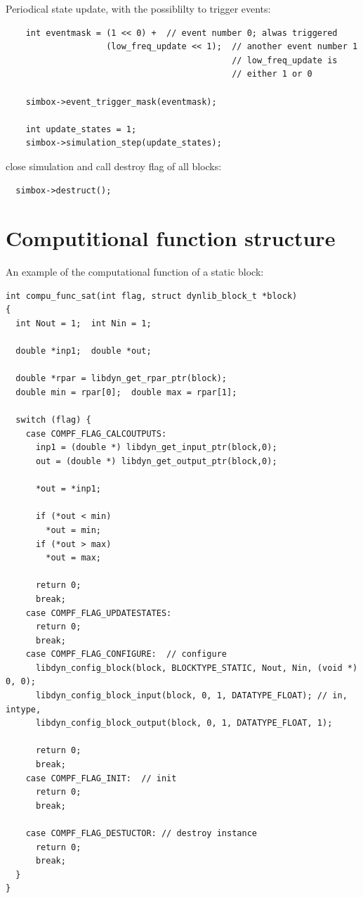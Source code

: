 \documentclass[%
	pdftex,%
	a4paper,%
	oneside,%
	11pt,%
	halfparskip,%
	headsepline,%
	bibtotocnumbered,%
	idxtotoc%
]{scrartcl}
\begin{document}
Periodical state update, with the possiblilty to trigger events:

\begin{verbatim}
    int eventmask = (1 << 0) +  // event number 0; alwas triggered
                    (low_freq_update << 1);  // another event number 1 
                                             // low_freq_update is 
                                             // either 1 or 0

    simbox->event_trigger_mask(eventmask);
    
    int update_states = 1;
    simbox->simulation_step(update_states); 
\end{verbatim}

close simulation and call destroy flag of all blocks:

\begin{verbatim}
  simbox->destruct();
\end{verbatim}


\section{Computitional function structure}

An example of the computational function of a static block:

\begin{verbatim}
int compu_func_sat(int flag, struct dynlib_block_t *block)
{
  int Nout = 1;  int Nin = 1;

  double *inp1;  double *out;	

  double *rpar = libdyn_get_rpar_ptr(block);
  double min = rpar[0];  double max = rpar[1];

  switch (flag) {
    case COMPF_FLAG_CALCOUTPUTS:
      inp1 = (double *) libdyn_get_input_ptr(block,0);
      out = (double *) libdyn_get_output_ptr(block,0);
      
      *out = *inp1;
      
      if (*out < min)
        *out = min;
      if (*out > max)
        *out = max;
      
      return 0;
      break;
    case COMPF_FLAG_UPDATESTATES:
      return 0;
      break;
    case COMPF_FLAG_CONFIGURE:  // configure
      libdyn_config_block(block, BLOCKTYPE_STATIC, Nout, Nin, (void *) 0, 0); 
      libdyn_config_block_input(block, 0, 1, DATATYPE_FLOAT); // in, intype, 
      libdyn_config_block_output(block, 0, 1, DATATYPE_FLOAT, 1);

      return 0;
      break;
    case COMPF_FLAG_INIT:  // init
      return 0;
      break;

    case COMPF_FLAG_DESTUCTOR: // destroy instance
      return 0;
      break;
  }
}
\end{verbatim}
\end{document}
